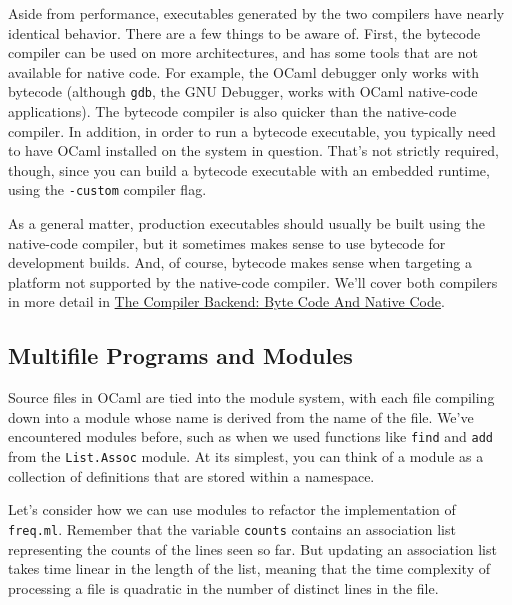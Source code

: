 Aside from performance, executables generated by the two compilers have
nearly identical behavior. There are a few things to be aware of. First,
the bytecode compiler can be used on more architectures, and has some
tools that are not available for native code. For example, the OCaml
debugger only works with bytecode (although
\passthrough{\lstinline!gdb!}, the GNU Debugger, works with OCaml
native-code applications). The bytecode compiler is also quicker than
the native-code compiler. In addition, in order to run a bytecode
executable, you typically need to have OCaml installed on the system in
question. That's not strictly required, though, since you can build a
bytecode executable with an embedded runtime, using the
\passthrough{\lstinline!-custom!} compiler flag.

As a general matter, production executables should usually be built
using the native-code compiler, but it sometimes makes sense to use
bytecode for development builds. And, of course, bytecode makes sense
when targeting a platform not supported by the native-code compiler.
We'll cover both compilers in more detail in
\href{compiler-backend.html\#the-compiler-backend-byte-code-and-native-code}{The
Compiler Backend: Byte Code And Native Code}.

\hypertarget{multi-file-programs-and-modules}{%
\subsection{Multifile Programs and
Modules}\label{multi-file-programs-and-modules}}

Source files in OCaml are tied into the module system, with each file
compiling down into a module whose name is derived from the name of the
file. We've encountered modules before, such as when we used functions
like \passthrough{\lstinline!find!} and \passthrough{\lstinline!add!}
from the \passthrough{\lstinline!List.Assoc!} module. At its simplest,
you can think of a module as a collection of definitions that are stored
within a namespace. 

Let's consider how we can use modules to refactor the implementation of
\passthrough{\lstinline!freq.ml!}. Remember that the variable
\passthrough{\lstinline!counts!} contains an association list
representing the counts of the lines seen so far. But updating an
association list takes time linear in the length of the list, meaning
that the time complexity of processing a file is quadratic in the number
of distinct lines in the file.

